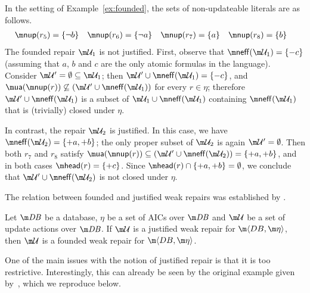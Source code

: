 \begin{example}
  In the setting of Example~\ref{ex:founded}, the sets of non-updateable literals are as follows.
  \begin{align*}
    \nup(r_5) &= \{\neg b\} &
    \nup(r_6) &= \{\neg a\} &
    \nup(r_7) &= \{a\} &
    \nup(r_8) &= \{b\}
  \end{align*}
  The founded repair $\UU_1$ is not justified.
  First, observe that $\neff(\UU_1)=\{{-c}\}$ (assuming that $a$, $b$ and $c$ are the only atomic formulas in the language).
  Consider $\UU'=\emptyset\subseteq\UU_1$; then $\UU'\cup\neff(\UU_1)=\{{-c}\}$, and $\actof(\nup(r))\not\subseteq(\UU'\cup\neff(\UU_1))$ for every $r\in\eta$; therefore $\UU'\cup\neff(\UU_1)$ is a subset of $\UU_1\cup\neff(\UU_1)$ containing $\neff(\UU_1)$ that is (trivially) closed under $\eta$.

  In contrast, the repair $\UU_2$ is justified.
  In this case, we have $\neff(\UU_2)=\{{+a},{+b}\}$; the only proper subset of $\UU_2$ is again $\UU'=\emptyset$.
  Then both $r_7$ and $r_8$ satisfy $\actof(\nup(r))\subseteq(\UU'\cup\neff(\UU_2))=\{{+a},{+b}\}$, and in both cases $\head(r)=\{{+c}\}$.
  Since $\head(r)\cap\{{+a},{+b}\}=\emptyset$, we conclude that $\UU'\cup\neff(\UU_2)$ is not closed under $\eta$.
\end{example}

The relation between founded and justified weak repairs was established by \citet{tplp/CaropreseT11}.
\begin{lemma}
  \label{lem:justified-founded}
  Let $\db$ be a database, $\eta$ be a set of AICs over $\db$ and $\UU$ be a set of update actions over $\db$.
  If $\UU$ is a justified weak repair for $\fulldb$, then $\UU$ is a founded weak repair for $\fulldb$.
\end{lemma}

One of the main issues with the notion of justified repair is that it is too restrictive.
Interestingly, this can already be seen by the original example given by~\citet{tplp/CaropreseT11}, which we reproduce below.

